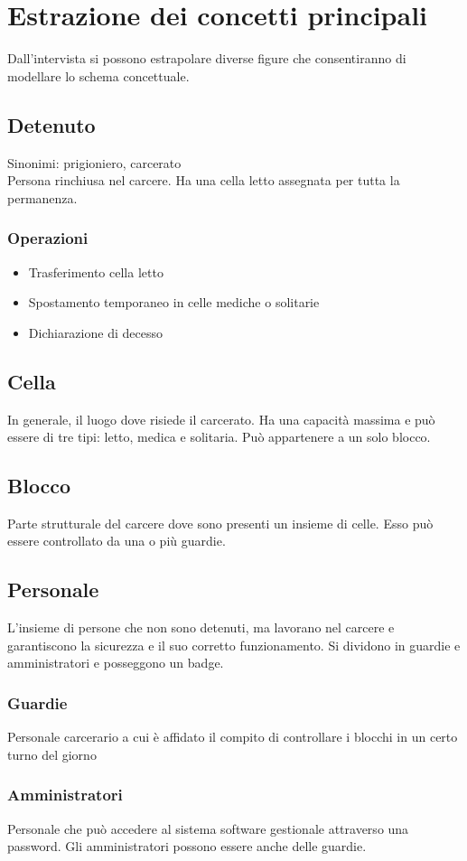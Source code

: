 \documentclass[a4paper,12pt]{report}
\begin{document}
\section{Estrazione dei concetti principali}
Dall'intervista si possono estrapolare diverse figure che consentiranno di modellare lo schema concettuale.
\subsection*{Detenuto}
Sinonimi: prigioniero, carcerato
%
\\Persona rinchiusa nel carcere.
%
Ha una cella letto assegnata per tutta la permanenza.
%
\subsubsection*{Operazioni}
\begin{itemize}
    \item Trasferimento cella letto
    \item Spostamento temporaneo in celle mediche o solitarie
    \item Dichiarazione di decesso
\end{itemize}
\subsection*{Cella}
In generale, il luogo dove risiede il carcerato.
%
Ha una capacità massima e può essere di tre tipi: letto, medica e solitaria.
%
Può appartenere a un solo blocco.
\subsection*{Blocco}
Parte strutturale del carcere dove sono presenti un insieme di celle.
%
Esso può essere controllato da una o più guardie.
\subsection*{Personale}
L'insieme di persone che non sono detenuti, ma lavorano nel carcere e garantiscono la sicurezza e il suo corretto funzionamento.
%
Si dividono in guardie e amministratori e posseggono un badge.
\subsubsection*{Guardie}
Personale carcerario a cui è affidato il compito di controllare i blocchi in un certo turno del giorno 
\subsubsection*{Amministratori}
Personale che può accedere al sistema software gestionale attraverso una password.
%
Gli amministratori possono essere anche delle guardie.
\end{document}
